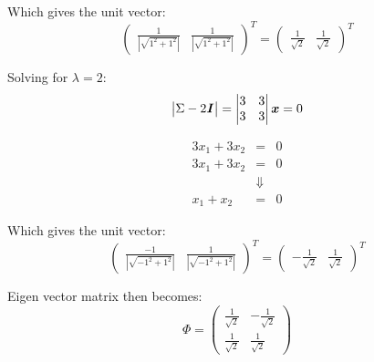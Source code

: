 \documentclass{homeworg}
\begin{document}
Which gives the unit vector:
\begin{equation}
    \begin{pmatrix}
        \frac{1}{|\sqrt{1^2+1^2}|} &  \frac{1}{|\sqrt{1^2+1^2}|}
    \end{pmatrix}^T
    =
    \begin{pmatrix}
        \frac{1}{\sqrt{2}} & \frac{1}{\sqrt{2}}
    \end{pmatrix}^T
\end{equation}

Solving for $\lambda = 2$:
\begin{equation}
    \begin{vmatrix}
        \Sigma - 2\textbf{\textit{I}}
    \end{vmatrix}
    = 
    \begin{vmatrix}
        3 & 3 \\
        3 & 3
    \end{vmatrix}\bm{x}
    = 0
\end{equation}

\begin{equation}
    \begin{matrix}
        3x_1 + 3x_2& =& 0 \\ 
        3x_1 + 3x_2&=& 0 \\
        & \Downarrow & \\
        x_1 + x_2 &=& 0
    \end{matrix}
\end{equation}

Which gives the unit vector:
\begin{equation}
    \begin{pmatrix}
        \frac{-1}{|\sqrt{-1^2+1^2}|} &  \frac{1}{|\sqrt{-1^2+1^2}|}
    \end{pmatrix}^T
    =
    \begin{pmatrix}
        -\frac{1}{\sqrt{2}} & \frac{1}{\sqrt{2}}
    \end{pmatrix}^T
\end{equation}

Eigen vector matrix then becomes:
\begin{equation}
    \Phi =
    \begin{pmatrix}
        \frac{1}{\sqrt{2}} & -\frac{1}{\sqrt{2}} \\
        \frac{1}{\sqrt{2}} & \frac{1}{\sqrt{2}}
    \end{pmatrix}
\end{equation}
\end{document}

